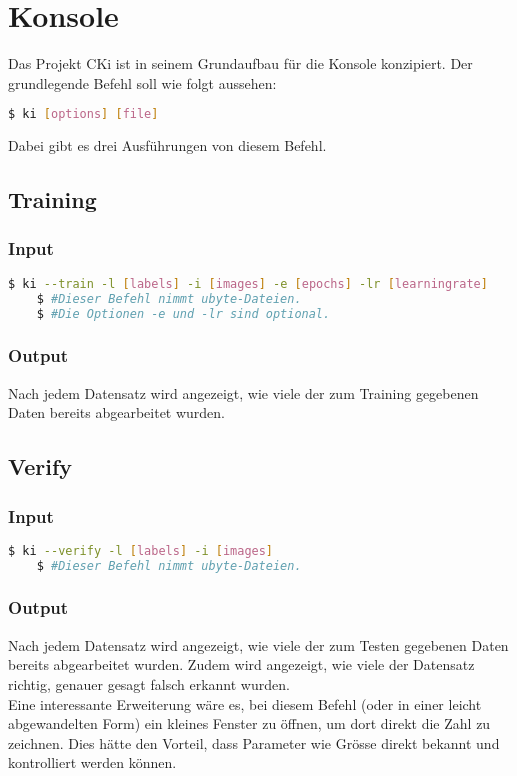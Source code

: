 \section{Konsole}
\label{sec:DesignKonsole}
Das Projekt CKi ist in seinem Grundaufbau für die Konsole konzipiert. Der grundlegende Befehl soll wie folgt aussehen: 
\begin{lstlisting}[language=bash]
	$ ki [options] [file]
\end{lstlisting}
Dabei gibt es drei Ausführungen von diesem Befehl.

\subsection{Training}
\label{sec:DesignTraining}
\subsubsection{Input}
\label{sec:DesignTraiInput}
\begin{lstlisting}[language=bash]
	$ ki --train -l [labels] -i [images] -e [epochs] -lr [learningrate]
	$ #Dieser Befehl nimmt ubyte-Dateien.
	$ #Die Optionen -e und -lr sind optional.
\end{lstlisting}

\subsubsection{Output}
\label{sec:TraiOutput}
Nach jedem Datensatz wird angezeigt, wie viele der zum Training gegebenen Daten bereits abgearbeitet wurden. 

\subsection{Verify}
\label{sec:DesignTest}
\subsubsection{Input}
\label{sec:DesignTestInput}
\begin{lstlisting}[language=bash]
	$ ki --verify -l [labels] -i [images]
	$ #Dieser Befehl nimmt ubyte-Dateien.
\end{lstlisting}

\subsubsection{Output}
\label{sec:TestOutput}
Nach jedem Datensatz wird angezeigt, wie viele der zum Testen gegebenen Daten bereits abgearbeitet wurden. Zudem wird angezeigt, wie viele der Datensatz richtig, genauer gesagt falsch erkannt wurden. 
\\
Eine interessante Erweiterung wäre es, bei diesem Befehl (oder in einer leicht abgewandelten Form) ein kleines Fenster zu öffnen, um dort direkt die Zahl zu zeichnen. Dies hätte den Vorteil, dass Parameter wie Grösse direkt bekannt und kontrolliert werden können.

